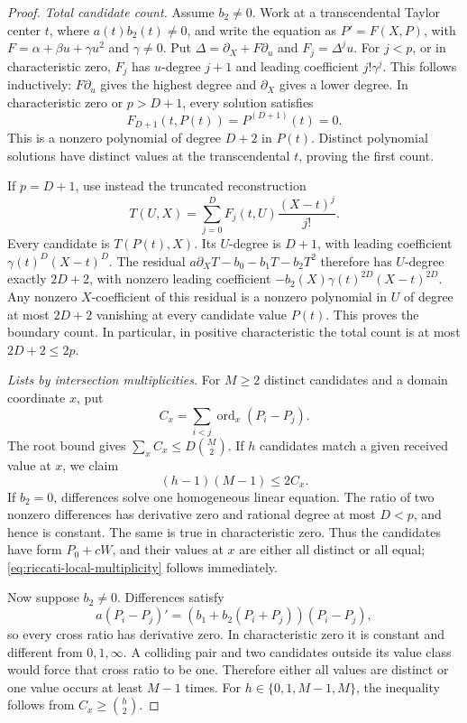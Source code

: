 \begin{proof}
\emph{Total candidate count.}
Assume $b_2\ne0$. Work at a transcendental Taylor center $t$, where
$a(t)b_2(t)\ne0$, and write the equation as
$P'=F(X,P)$, with $F=\alpha+\beta u+\gamma u^2$ and $\gamma\ne0$.
Put $\Delta=\partial_X+F\partial_u$ and $F_j=\Delta^j u$.
For $j<p$, or in characteristic zero, $F_j$ has $u$-degree $j+1$
and leading coefficient $j!\gamma^j$. This follows inductively:
$F\partial_u$ gives the highest degree and $\partial_X$ gives a
lower degree. In characteristic zero or $p>D+1$, every solution
satisfies
\[
 F_{D+1}(t,P(t))=P^{(D+1)}(t)=0.
\]
This is a nonzero polynomial of degree $D+2$ in $P(t)$.
Distinct polynomial solutions have distinct values at the
transcendental $t$, proving the first count.

If $p=D+1$, use instead the truncated reconstruction
\[
 T(U,X)=\sum_{j=0}^D F_j(t,U)\frac{(X-t)^j}{j!}.
\]
Every candidate is $T(P(t),X)$. Its $U$-degree is $D+1$, with
leading coefficient $\gamma(t)^D(X-t)^D$. The residual
$a\partial_XT-b_0-b_1T-b_2T^2$ therefore has $U$-degree exactly
$2D+2$, with nonzero leading coefficient
$-b_2(X)\gamma(t)^{2D}(X-t)^{2D}$. Any nonzero $X$-coefficient
of this residual is a nonzero polynomial in $U$ of degree at most
$2D+2$ vanishing at every candidate value $P(t)$. This proves the
boundary count. In particular, in positive characteristic the total
count is at most $2D+2\le2p$.

\emph{Lists by intersection multiplicities.}
For $M\ge2$ distinct candidates and a domain coordinate $x$, put
\[
 C_x=\sum_{i<j}\operatorname{ord}_x(P_i-P_j).
\]
The root bound gives $\sum_xC_x\le D\binom M2$. If $h$ candidates
match a given received value at $x$, we claim
\begin{equation}\label{eq:riccati-local-multiplicity}
 (h-1)(M-1)\le2C_x.
\end{equation}
If $b_2=0$, differences solve one homogeneous linear equation.
The ratio of two nonzero differences has derivative zero and
rational degree at most $D<p$, and hence is constant. The same is
true in characteristic zero. Thus the candidates have form $P_0+cW$,
and their values at $x$ are either all distinct or all equal;
\eqref{eq:riccati-local-multiplicity} follows immediately.

Now suppose $b_2\ne0$. Differences satisfy
\[
 a(P_i-P_j)'=(b_1+b_2(P_i+P_j))(P_i-P_j),
\]
so every cross ratio has derivative zero. In characteristic zero
it is constant and different from $0,1,\infty$. A colliding pair
and two candidates outside its value class would force that cross
ratio to be one. Therefore either all values are distinct or one
value occurs at least $M-1$ times. For
$h\in\{0,1,M-1,M\}$, the inequality follows from
$C_x\ge\binom h2$.


\end{proof}

